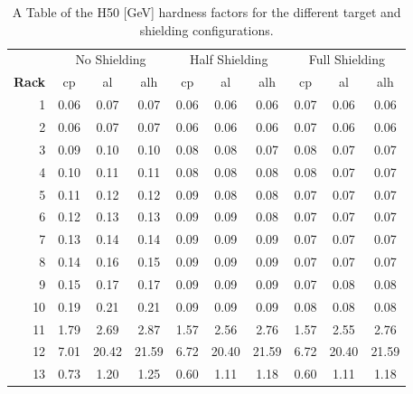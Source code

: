 \begin{table}[htbp]
\centering
\begin{tabular}{r|c|c|c|c|c|c|c|c|c}
& \multicolumn{3}{c|}{No Shielding} & \multicolumn{3}{c|}{Half Shielding} & \multicolumn{3}{c}{Full Shielding} \\ \cline{2-10}
\textbf{Rack}  & cp    & al    & alh   & cp    & al    & alh & cp    & al    & alh\\ 
\hline
1  &     0.06 &     0.07 &      0.07 &     0.06 &     0.06 &      0.06 &     0.07 &     0.06 &      0.06 \\
2  &     0.06 &     0.07 &      0.07 &     0.06 &     0.06 &      0.06 &     0.07 &     0.06 &      0.06 \\
3  &     0.09 &     0.10 &      0.10 &     0.08 &     0.08 &      0.07 &     0.08 &     0.07 &      0.07 \\
4  &     0.10 &     0.11 &      0.11 &     0.08 &     0.08 &      0.08 &     0.08 &     0.07 &      0.07 \\
5  &     0.11 &     0.12 &      0.12 &     0.09 &     0.08 &      0.08 &     0.07 &     0.07 &      0.07 \\
6  &     0.12 &     0.13 &      0.13 &     0.09 &     0.09 &      0.08 &     0.07 &     0.07 &      0.07 \\
7  &     0.13 &     0.14 &      0.14 &     0.09 &     0.09 &      0.09 &     0.07 &     0.07 &      0.07 \\
8  &     0.14 &     0.16 &      0.15 &     0.09 &     0.09 &      0.09 &     0.07 &     0.07 &      0.07 \\
9  &     0.15 &     0.17 &      0.17 &     0.09 &     0.09 &      0.09 &     0.07 &     0.08 &      0.08 \\
10 &     0.19 &     0.21 &      0.21 &     0.09 &     0.09 &      0.09 &     0.08 &     0.08 &      0.08 \\
11 &     1.79 &     2.69 &      2.87 &     1.57 &     2.56 &      2.76 &     1.57 &     2.55 &      2.76 \\
12 &     7.01 &    20.42 &     21.59 &     6.72 &    20.40 &     21.59 &     6.72 &    20.40 &     21.59 \\
13 &     0.73 &     1.20 &      1.25 &     0.60 &     1.11 &      1.18 &     0.60 &     1.11 &      1.18 \\
\end{tabular}
\caption{A Table of the H50 [GeV] hardness factors for the different target and shielding configurations.}
\label{tab:hardness50}%
\end{table}%


